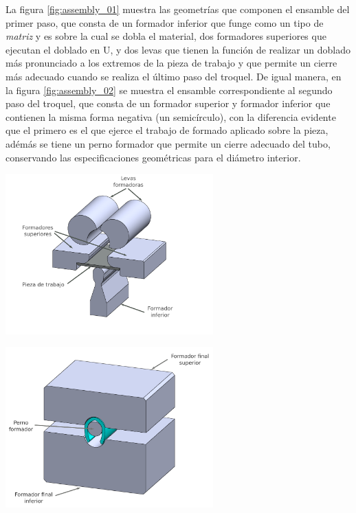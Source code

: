 La figura \ref{fig:assembly_01} muestra las geometrías que componen el ensamble del primer paso, 
que consta de un formador inferior que funge como un tipo de \textit{matriz} y es sobre la cual 
se dobla el material, dos formadores superiores que ejecutan el doblado en U, y dos levas 
que tienen la función de realizar un doblado más pronunciado a los extremos de la pieza de 
trabajo y que permite un cierre más adecuado cuando se realiza el último paso del troquel.
De igual manera, en la figura \ref{fig:assembly_02} se muestra el ensamble correspondiente 
al segundo paso del troquel, que consta de un formador superior y formador inferior que contienen 
la misma forma negativa (un semicírculo), con la diferencia evidente que el primero es el que ejerce 
el trabajo de formado aplicado sobre la pieza, adémás se tiene un perno formador que permite 
un cierre adecuado del tubo, conservando las especificaciones geométricas para el diámetro interior.

\begin{center}
\includegraphics[width=0.6\textwidth]{src/ch3/assembly_01.pdf}
\label{fig:assembly_01}
\end{center}

\begin{center}
\includegraphics[width=0.6\textwidth]{src/ch3/assembly_02.pdf}
\label{fig:assembly_02}
\end{center}

